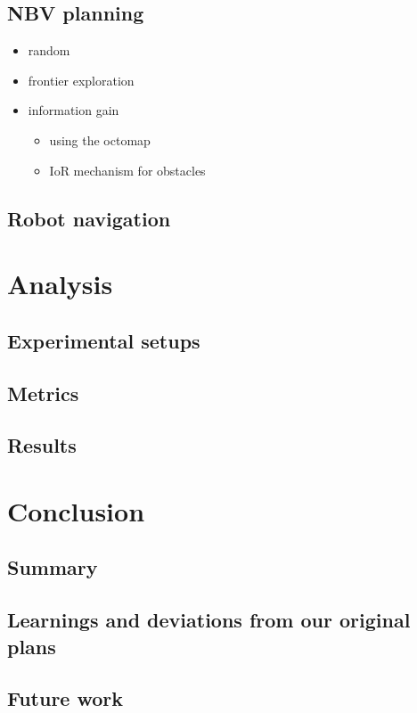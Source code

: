 \documentclass[a4paper,11pt,english]{article}
\begin{document}
\subsection{NBV planning}

\begin{itemize}
	\item random
	\item frontier exploration
	\item information gain
	\begin{itemize}
	\item using the octomap
	\item IoR mechanism for obstacles
	\end{itemize}
\end{itemize}

\subsection{Robot navigation}

\section{Analysis}

\subsection{Experimental setups}
\subsection{Metrics}
\subsection{Results}

\section{Conclusion}

\subsection{Summary}
\subsection{Learnings and deviations from our original plans}
\subsection{Future work}
\end{document}
